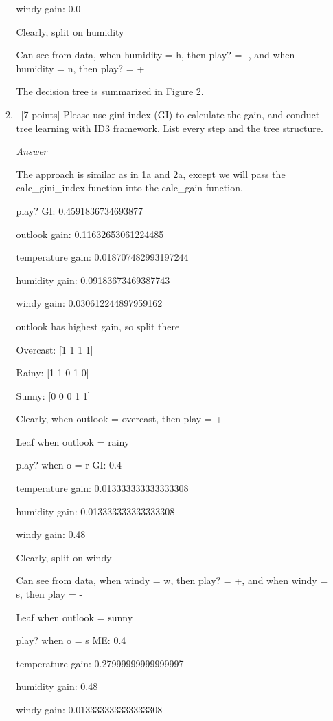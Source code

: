 \documentclass[12pt, fullpage,letterpaper]{article}
\begin{document}
\begin{enumerate}
\begin{enumerate}
    windy gain: 0.0
    
    Clearly, split on humidity

    Can see from data, when humidity = h, then play? = -, and when humidity = n, then play? = +
    
    The decision tree is summarized in Figure 2.
	
	\item~[7 points] Please use gini index (GI) to calculate the gain, and conduct tree learning with ID3 framework. List every step and the tree structure.
	
	\emph{Answer}
	
	The approach is similar as in 1a and 2a, except we will pass the calc\_gini\_index function into the calc\_gain function.
	
	play? GI:  0.4591836734693877
	
    outlook gain: 0.11632653061224485
    
    temperature gain: 0.018707482993197244
    
    humidity gain: 0.09183673469387743
    
    windy gain: 0.030612244897959162
    
    outlook has highest gain, so split there

    Overcast: [1 1 1 1]

    Rainy: [1 1 0 1 0]

    Sunny: [0 0 0 1 1]

    Clearly, when outlook = overcast, then play = +
    
    \hline
    Leaf when outlook = rainy
    
    play? when o = r GI:  0.4
    
    temperature gain: 0.013333333333333308
    
    humidity gain: 0.013333333333333308
    
    windy gain: 0.48
    
    Clearly, split on windy
    
    Can see from data, when windy = w, then play? = +, and when windy = s, then play = -
    
    \hline
    Leaf when outlook = sunny
    
    play? when o = s ME:  0.4
    
    temperature gain: 0.27999999999999997
    
    humidity gain: 0.48
    
    windy gain: 0.013333333333333308
    

\end{enumerate}
\end{enumerate}
\end{document}
